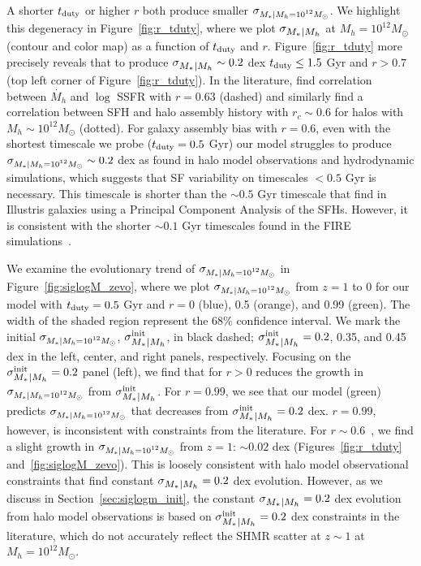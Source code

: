 \documentclass[12pt, letterpaper, preprint, tighten]{aastex62}
\newcommand{\tduty}{t_{\rm duty}}
\newcommand{\siglogm}{\sigma_{\scaleto{M_*|M_h}{8pt}}}
\newcommand{\sigtwe}{\sigma_{\scaleto{M_*|M_h=10^{12}M_\odot}{8pt}}}
\begin{document}
A shorter $t_{\rm duty}$ or higher $r$ both produce smaller $\sigtwe$. 
We highlight this degeneracy in Figure~\ref{fig:r_tduty}, where we plot 
$\siglogm$ at $M_h=10^{12}M_\odot$ (contour and color map) as 
a function of $t_{\rm duty}$ and $r$. Figure~\ref{fig:r_tduty} more precisely 
reveals that to produce $\siglogm \sim 0.2$ dex $\tduty \leq 1.5$ Gyr and 
$r > 0.7$ (top left corner of Figure~\ref{fig:r_tduty}). 
In the literature, \cite{tinker2018b} find correlation
between $\dot{M_h}$ and $\log$ SSFR with $r = 0.63$ (dashed) and
\cite{behroozi2019} similarly find a correlation between SFH and halo
assembly history with $r_c \sim 0.6$ for halos with $M_h \sim 10^{12}M_\odot$
(dotted). For galaxy assembly bias with $r = 0.6$, even with the shortest timescale 
we probe ($t_{\rm duty} = 0.5$ Gyr) our model struggles to produce 
$\sigtwe \sim 0.2$ dex as found in halo model observations and hydrodynamic 
simulations, which suggests that SF variability on timescales $< 0.5$ Gyr is necessary. 
This timescale is shorter than the $\sim 0.5$ Gyr timescale that \cite{sparre2015} 
find in Illustris galaxies using a Principal Component Analysis of the SFHs. 
However, it is consistent with the shorter $\sim 0.1$ Gyr timescales found 
in the FIRE simulations~\citep{hopkins2014, sparre2017}.

We examine the evolutionary trend of $\sigtwe$ in Figure~\ref{fig:siglogM_zevo}, 
where we plot $\sigtwe$ from $z=1$ to 0 for our model with $t_{\rm duty} = 0.5$ Gyr 
and $r = 0$ (blue), 0.5 (orange), and 0.99 (green). The width of the shaded 
region represent the $68\%$ confidence interval. We mark the
initial $\sigtwe$, $\siglogm^{\rm init}$, in black dashed; 
$\siglogm^{\rm init} = 0.2$, 0.35, and 0.45 dex in the left, center, and right 
panels, respectively. Focusing on the $\siglogm^{\rm init} = 0.2$ panel (left),
we find that for $r > 0$ reduces the growth in $\sigtwe$ from $\siglogm^{\rm init}$. 
For $r = 0.99$, we see that our model (green) predicts $\sigtwe$ that decreases 
from $\siglogm^{\rm init} = 0.2$ dex. $r = 0.99$, however, is inconsistent with 
constraints from the literature.  For $r \sim 0.6$~\citep{behroozi2019,tinker2018b}, 
we find a slight growth in $\sigtwe$ from $z=1$: $\sim0.02$ dex (Figures~\ref{fig:r_tduty} 
and~\ref{fig:siglogM_zevo}). This is loosely consistent with halo model observational 
constraints that find constant $\siglogm = 0.2$ dex evolution. However, as we 
discuss in Section~\ref{sec:siglogm_init}, the constant $\siglogm = 0.2$ dex 
evolution from halo model observations is based on $\siglogm^{\rm init} = 0.2$ dex 
constraints in the literature, which do not accurately reflect the SHMR scatter 
at $z \sim 1$ at $M_h = 10^{12}M_\odot$. 
\end{document}
